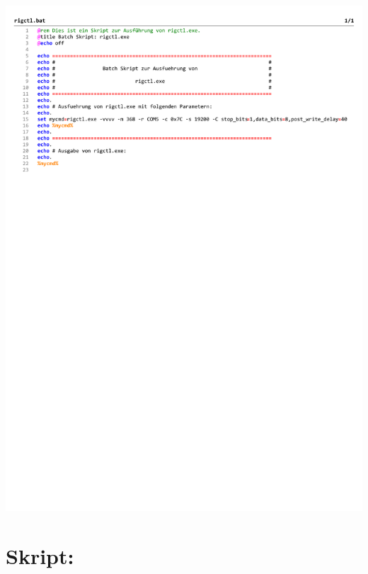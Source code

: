 \begin{center}
	\includegraphics[width=1\textwidth]{./appendicies/rigctl}
\end{center}


\chapter{Skript: }
\label{chap:rotctldbat}

